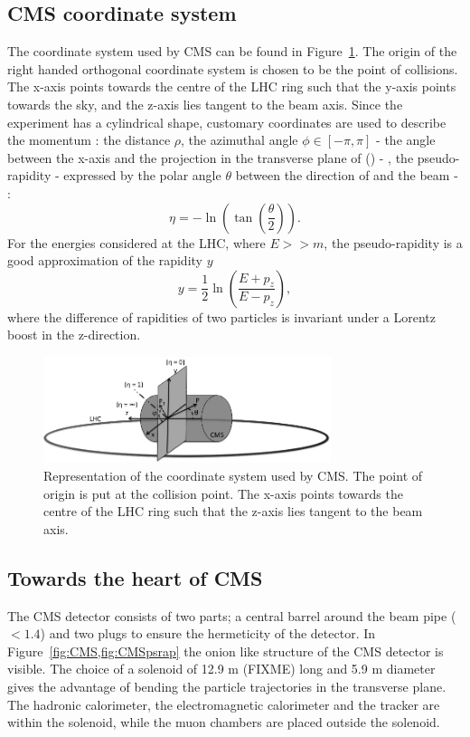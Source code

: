 \subsection{CMS coordinate system}
The coordinate system used by CMS can be found in Figure~\ref{fig:CMScoord}. The origin of the right handed orthogonal coordinate system is chosen to be the point of collisions. The x-axis points towards the centre of the LHC ring such that the y-axis points towards the sky, and the z-axis lies tangent to the beam axis. Since the experiment has a cylindrical shape, customary coordinates are used to describe the momentum \impuls: the distance $\rho$, the azimuthal angle $\phi \in \left[-\pi,\pi\right]$ - the angle between the x-axis and the projection in the transverse plane of \impuls (\trimpuls) - , the pseudo-rapidity \psrap - expressed by the polar angle $\theta$ between the direction of \impuls and the beam - : 
\begin{equation}
\eta = - \ln \left(\tan \left(\frac{\theta}{2}\right)\right).
\end{equation}
For the energies considered at the LHC, where $E >> m$, the pseudo-rapidity is a good approximation of the rapidity $y$
\begin{equation}
y = \frac{1}{2} \ln \left(\frac{E + p_z}{E - p_z}\right), 
\end{equation}
where the difference of rapidities of two particles is invariant under a Lorentz boost in the z-direction.
 \begin{figure}[ht]
	\centering
	\includegraphics[width=0.75\textwidth]{2_ExperimentalSetup/Figures/imageedit_1_9146672677}
	\caption{Representation of the coordinate system used by CMS. The point of origin is put at the collision point. The x-axis points towards the centre of the LHC ring such that the z-axis lies tangent to the beam axis. }
	\label{fig:CMScoord}
\end{figure}

\subsection{Towards the heart of CMS}
The CMS detector consists of two parts; a central barrel around the beam pipe (\abspsrap $<1.4$) and two plugs to ensure the hermeticity of the detector. In Figure~\ref{fig:CMS,fig:CMSpsrap} the onion like structure of the CMS detector is visible. The choice of a solenoid of 12.9 \si{ \meter} (FIXME) long and 5.9 \si{ \meter}
diameter gives the advantage of bending the particle trajectories in the transverse plane. The hadronic calorimeter,  the electromagnetic calorimeter and the tracker are within the solenoid, while the muon chambers are placed outside the solenoid.

